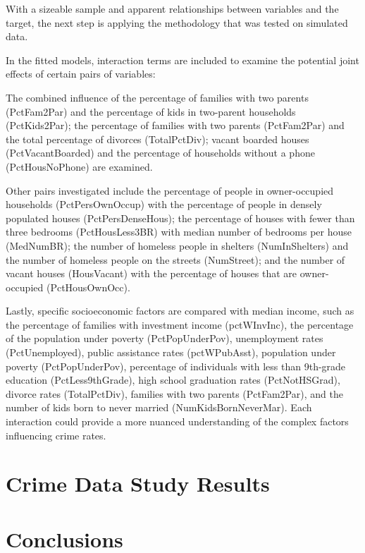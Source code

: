 \documentclass[
  11pt,
]{article}
\begin{document}
With a sizeable sample and apparent relationships between variables and
the target, the next step is applying the methodology that was tested on
simulated data.

In the fitted models, interaction terms are included to examine the
potential joint effects of certain pairs of variables:

The combined influence of the percentage of families with two parents
(PctFam2Par) and the percentage of kids in two-parent households
(PctKids2Par); the percentage of families with two parents (PctFam2Par)
and the total percentage of divorces (TotalPctDiv); vacant boarded
houses (PctVacantBoarded) and the percentage of households without a
phone (PctHousNoPhone) are examined.

Other pairs investigated include the percentage of people in
owner-occupied households (PctPersOwnOccup) with the percentage of
people in densely populated houses (PctPersDenseHous); the percentage of
houses with fewer than three bedrooms (PctHousLess3BR) with median
number of bedrooms per house (MedNumBR); the number of homeless people
in shelters (NumInShelters) and the number of homeless people on the
streets (NumStreet); and the number of vacant houses (HousVacant) with
the percentage of houses that are owner-occupied (PctHousOwnOcc).

Lastly, specific socioeconomic factors are compared with median income,
such as the percentage of families with investment income (pctWInvInc),
the percentage of the population under poverty (PctPopUnderPov),
unemployment rates (PctUnemployed), public assistance rates
(pctWPubAsst), population under poverty (PctPopUnderPov), percentage of
individuals with less than 9th-grade education (PctLess9thGrade), high
school graduation rates (PctNotHSGrad), divorce rates (TotalPctDiv),
families with two parents (PctFam2Par), and the number of kids born to
never married (NumKidsBornNeverMar). Each interaction could provide a
more nuanced understanding of the complex factors influencing crime
rates.

\newpage

\section{Crime Data Study Results}

\newpage

\section{Conclusions}
\end{document}
